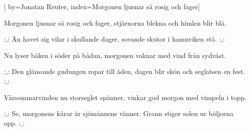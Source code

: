 


[ 	%
	by={Jonatan Reuter},	%
	index={Morgonen ljusnar så rosig och fager}]		%
	
\beginverse*		%
Morgonen ljusnar så rosig och fager,
stjärnorna blekna och himlen blir blå.
\endverse			%

\beginchorus		%
:,: Än havet sig vilar i skullande dager,
sovande skutor i hamnviken stå. :,:
\endchorus			%

\beginverse*		%
Nu lyser båken i söder på bådan,
morgonen vaknar med vind från sydväst.
\endverse			%

\beginchorus		%
:,: Den glänsande gudungen ropar till åden,
dagen blir skön och seglatsen en fest. :,:
\endchorus			%

\beginverse*		%
Vårsommarvinden nu storseglet spänner,
vinkar god morgon med vimpeln i topp.
\endverse			%

\beginchorus		%
:,: Se, morgonens kårar är sjömännens vänner.
Grann stiger solen ur böljorna opp. :,:
\endchorus			%
\endsong			%
